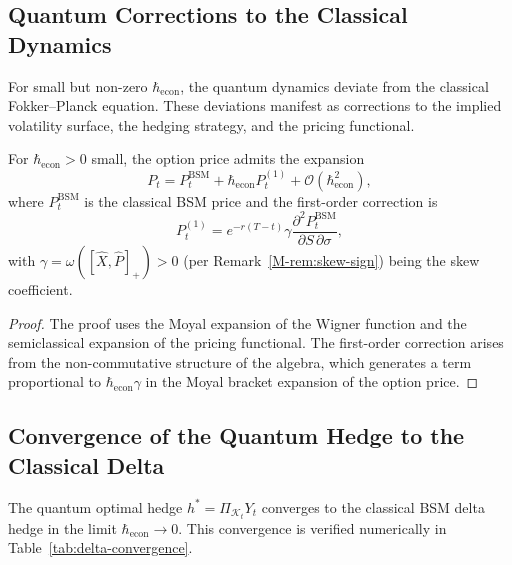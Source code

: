 \subsection{Quantum Corrections to the Classical Dynamics}

For small but non-zero $\hbar_{\mathrm{econ}}$, the quantum dynamics deviate
from the classical Fokker--Planck equation. These deviations manifest as
corrections to the implied volatility surface, the hedging strategy, and the
pricing functional.

\begin{theorem}\label{thm:quantum-correction}
For $\hbar_{\mathrm{econ}} > 0$ small, the option price admits the expansion
\begin{equation*}
    P_t = P_t^{\mathrm{BSM}} + \hbar_{\mathrm{econ}} P_t^{(1)}
    + \mathcal{O}(\hbar_{\mathrm{econ}}^2),
\end{equation*}
where $P_t^{\mathrm{BSM}}$ is the classical BSM price and the first-order
correction is
\begin{equation*}
    P_t^{(1)} = e^{-r(T-t)} \gamma \frac{\partial^2 P_t^{\mathrm{BSM}}}
        {\partial S \, \partial \sigma},
\end{equation*}
with $\gamma = \omega([\hat{X}, \hat{P}]_+) > 0$ (per Remark~\ref{M-rem:skew-sign})
being the skew coefficient.
\end{theorem}

\begin{proof}
The proof uses the Moyal expansion of the Wigner function and the semiclassical
expansion of the pricing functional. The first-order correction arises from the
non-commutative structure of the algebra, which generates a term proportional to
$\hbar_{\mathrm{econ}} \gamma$ in the Moyal bracket expansion of the option
price.
\end{proof}

\subsection{Convergence of the Quantum Hedge to the Classical Delta}

The quantum optimal hedge $h^* = \Pi_{\mathcal{K}_t} Y_t$ converges to the
classical BSM delta hedge in the limit $\hbar_{\mathrm{econ}} \to 0$. This
convergence is verified numerically in Table~\ref{tab:delta-convergence}.

